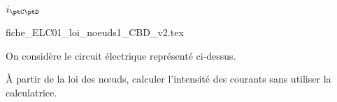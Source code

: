 



\begin{enonce}
$i_{\ptC\ptD}$
\end{enonce}




\finEntrainement


\newpage

\hauteurLargeurCadreReponse		{7mm}{20mm}
\initialisationEntrainement


\begin{center}
{fiche_ELC01_loi_noeuds1_CBD_v2.tex}
\end{center}

On considère le circuit électrique représenté ci-dessus. 

À partir de la loi des n\oe uds, calculer l'intensité des courants sans utiliser la calculatrice.

\medskip

